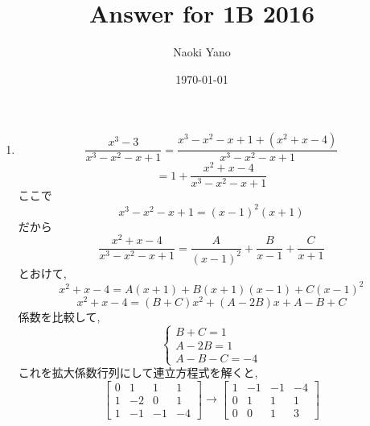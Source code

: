 \documentclass[a4paper,10pt,report]{amsart}
\title{Answer for 1B 2016}
\author{Naoki Yano}
\date{\today}
\theoremstyle{plain}
\theoremstyle{definition}
\theoremstyle{remark}
\begin{document}
    \maketitle
    \begin{enumerate}
        \item 
        \begin{equation*}
            \frac{x^{3}-3}{x^{3}-x^{2}-x+1}=\frac{x^{3}-x^{2}-x+1+(x^{2}+x-4)}{x^{3}-x^{2}-x+1}
        \end{equation*}
        \begin{equation*}
            =1+\frac{x^{2}+x-4}{x^{3}-x^{2}-x+1}
        \end{equation*}
        ここで
        \begin{equation*}
            x^{3}-x^{2}-x+1={(x-1)}^{2}(x+1)
        \end{equation*}
        だから
        \begin{equation*}
            \frac{x^{2}+x-4}{x^{3}-x^{2}-x+1}=\frac{A}{{(x-1)}^{2}}+\frac{B}{x-1}+\frac{C}{x+1}
        \end{equation*}
        とおけて, 
        \begin{equation*}
            x^{2}+x-4=A(x+1)+B(x+1)(x-1)+C{(x-1)}^{2}
        \end{equation*}
        \begin{equation*}
            x^{2}+x-4=(B+C)x^{2}+(A-2B)x+A-B+C
        \end{equation*}
        係数を比較して,
        \begin{equation*}
            \begin{cases}
                B+C=1\\
                A-2B=1\\
                A-B-C=-4
            \end{cases}
        \end{equation*}
        これを拡大係数行列にして連立方程式を解くと, 
        \begin{equation*}
            \begin{bmatrix}
                0 & 1 & 1 & 1\\
                1 & -2 & 0 & 1\\
                1 & -1 & -1 & -4
            \end{bmatrix}
            \to \begin{bmatrix}
                1 & -1 & -1 & -4\\
                0 & 1 & 1 & 1\\
                0 & 0 & 1 & 3

\end{bmatrix}
\end{equation*}
\end{enumerate}
\end{document}
